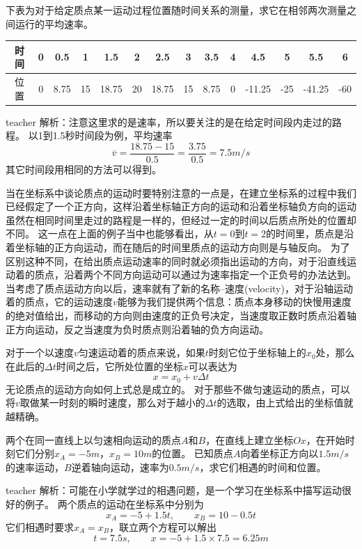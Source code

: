 \begin{example}
下表为对于给定质点某一运动过程位置随时间关系的测量，求它在相邻两次测量之间运行的平均速率。

\begin{tabular}{|c|ccccccccccccc|}
\hline 
时间 & 0 & 0.5 & 1 & 1.5 & 2 & 2.5 & 3 & 3.5 & 4 & 4.5 & 5 & 5.5 & 6  \\ 
\hline 
位置 & 0 & 8.75 & 15 & 18.75 & 20 & 18.75 & 15 & 8.75 & 0 & -11.25 & -25 & -41.25 & -60 \\ 
\hline 
\end{tabular} 
\begin{taggedblock}{teacher}
\noindent
解析：注意这里求的是速率，所以要关注的是在给定时间段内走过的路程。
以1到1.5秒时间段为例，平均速率
\[
\overline{v} = \frac{18.75-15}{0.5} = \frac{3.75}{0.5} = 7.5\unit{m/s}
\]
其它时间段用相同的方法可以得到。
\end{taggedblock}
\end{example}

当在坐标系中谈论质点的运动时要特别注意的一点是，在建立坐标系的过程中我们已经假定了一个正方向，这样沿着坐标轴正方向的运动和沿着坐标轴负方向的运动虽然在相同时间里走过的路程是一样的，但经过一定的时间以后质点所处的位置却不同。
这一点在上面的例子当中也能够看出，从$t=0$到$t=2$的时间里，质点是沿着坐标轴的正方向运动，而在随后的时间里质点的运动方向则是与轴反向。
为了区别这种不同，在给出质点运动速率的同时就必须指出运动的方向，对于沿直线运动着的质点，沿着两个不同方向运动可以通过为速率指定一个正负号的办法达到。
当考虑了质点运动方向以后，速率就有了新的名称--{\heiti 速度(velocity)}，对于沿轴运动着的质点，它的运动速度$v$能够为我们提供两个信息：质点本身移动的快慢用速度的绝对值给出，而移动的方向则由速度的正负号决定，当速度取正数时质点沿着轴正方向运动，反之当速度为负时质点则沿着轴的负方向运动。

对于一个以速度$v$匀速运动着的质点来说，如果$t$时刻它位于坐标轴上的$x_0$处，那么在此后的$\Delta t$时间之后，它所处位置的坐标$x$可以表达为
\begin{equation}
x = x_0 +v\Delta t
\end{equation}
无论质点的运动方向如何上式总是成立的。
对于那些不做匀速运动的质点，可以将$v$取做某一时刻的瞬时速度，那么对于越小的$\Delta t $的选取，由上式给出的坐标值就越精确。

\begin{example}
两个在同一直线上以匀速相向运动的质点$A$和$B$，在直线上建立坐标$Ox$，在开始时刻它们分别$x_A = -5\unit{m}$，$x_B=10\unit{m}$的位置。
已知质点$A$向着坐标正方向以$1.5\unit{m/s}$的速率运动，$B$逆着轴向运动，速率为$0.5\unit{m/s}$，求它们相遇的时间和位置。
\begin{taggedblock}{teacher}
\noindent
解析：可能在小学就学过的相遇问题，是一个学习在坐标系中描写运动很好的例子。
两个质点的运动在坐标系中分别为
\[x_A = -5+1.5 t,\qquad x_B = 10-0.5 t\]
它们相遇时要求$x_A = x_B$，联立两个方程可以解出
\[t = 7.5\unit{s},\qquad x = -5+1.5\times 7.5 = 6.25\unit{m}\]
\end{taggedblock}
\end{example}

